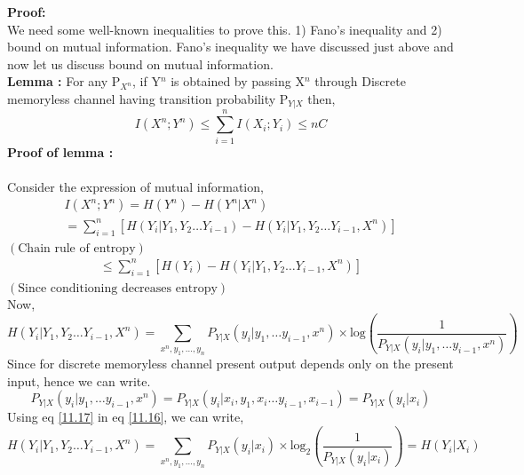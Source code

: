 \documentclass{article}
\begin{document}
\textbf{Proof:} \\ We need some well-known inequalities to prove this. 1) Fano's inequality and 2) bound on mutual information. Fano's inequality we have discussed just above and now let us discuss bound on mutual information.\\
\textbf{Lemma :} \hspace{1mm}For any P$_{X^n}$, if Y$^{n}$ is obtained by passing  X$^{n}$ through Discrete memoryless channel having transition probability P$_{Y|X}$  then,
\begin{equation}
	I \left( X^n ; Y^n\right) \leq \sum_{i=1}^{n} I \left( {X_i ; Y_i} \right) \leq nC \label{11.12}
\end{equation}
 \textbf{Proof of lemma :}\\\\
Consider the expression of mutual information,
 \begin{gather}
 	I\left( X^n; Y^n\right) = H \left( Y^n\right) - H \left( Y^n|X^n\right) \label{11.13}\\
 = \sum_{i =1}^{n} \left[ H \left(Y_i|Y_1, Y_2 \dots Y_{i-1}\right) - H \left( Y_i|Y_1, Y_2 \dots Y_{i-1}, X^n \right)\right] \label{11.14}
 \end{gather}
 	\hspace{10cm} $\left( \text{Chain rule of entropy}\right)$	
 	\begin{gather}
 	\leq \sum_{i=1}^{n} \left[ H\left( Y_i\right) - H\left( Y_i|Y_1, Y_2 \dots Y_{i-1}, X^n \right) \right] \label{11.15}
 	\end{gather}
 	\hspace{10cm} $\left( \text{Since conditioning decreases  entropy}\right)$\\ 
 Now,
 \begin{equation}
 H \left( Y_i|Y_1, Y_2 \dots Y_{i-1}, X^n \right)   =  \sum_{x^n, y_1, \dots , y_n} P_{Y|X}\left( y_i|y_1, \dots y_{i-1}, x^n \right) \times \text{log}\left( \frac{1}{P_{Y|X}\left( y_i|y_1, \dots y_{i-1}, x^n \right)}  \right) \label{11.16}
 \end{equation}
 	Since for discrete memoryless channel present output depends only on the present input, hence we can write.
 	\begin{equation}	
 P_{Y|X}\left( y_i|y_1, \dots y_{i-1}, x^n \right) =   P_{Y|X}\left( y_i |x_i, y_1,x_i \dots y_{i-1},x_{i-1} \right) =  P_{Y|X}\left( y_i | x_i \right) \label{11.17}
 \end{equation}
Using eq \eqref{11.17} in eq \eqref{11.16}, we can write,
 	\begin{equation}
  H \left( Y_i|Y_1, Y_2 \dots Y_{i-1}, X^n \right) =  \sum_{x^n, y_1, \dots , y_n} P_{Y|X}\left( y_i|x_i \right) \times \text{log}_{2}\left(  \frac{1}{ P_{Y|X}\left( y_i| x_i \right)}\right) = 	H \left( Y_i|X_i \right) \label{11.18}	
 \end{equation}
\end{document}
